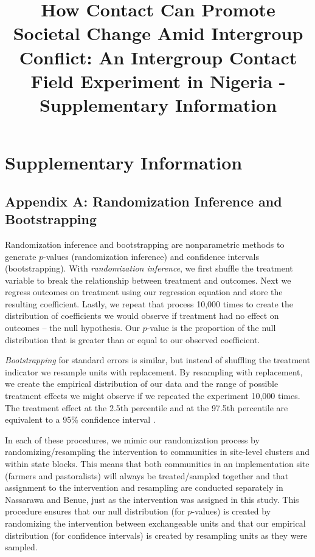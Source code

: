 \documentclass[
]{article}
\title{How Contact Can Promote Societal Change Amid Intergroup Conflict:
An Intergroup Contact Field Experiment in Nigeria - Supplementary
Information}
\author{}
\date{\vspace{-2.5em}}
\begin{document}
\maketitle

{
\setcounter{tocdepth}{2}
\tableofcontents
}
\hypertarget{supplementary-information}{%
\section{Supplementary Information}\label{supplementary-information}}

\hypertarget{appendix-a-randomization-inference-and-bootstrapping}{%
\subsection{Appendix A: Randomization Inference and
Bootstrapping}\label{appendix-a-randomization-inference-and-bootstrapping}}

Randomization inference and bootstrapping are nonparametric methods to
generate \(p\)-values (randomization inference) and confidence intervals
(bootstrapping). With \emph{randomization inference}, we first shuffle
the treatment variable to break the relationship between treatment and
outcomes. Next we regress outcomes on treatment using our regression
equation and store the resulting coefficient. Lastly, we repeat that
process 10,000 times to create the distribution of coefficients we would
observe if treatment had no effect on outcomes -- the null hypothesis.
Our \(p\)-value is the proportion of the null distribution that is
greater than or equal to our observed coefficient.

\emph{Bootstrapping} for standard errors is similar, but instead of
shuffling the treatment indicator we resample units with replacement. By
resampling with replacement, we create the empirical distribution of our
data and the range of possible treatment effects we might observe if we
repeated the experiment 10,000 times. The treatment effect at the 2.5th
percentile and at the 97.5th percentile are equivalent to a 95\%
confidence interval .

In each of these procedures, we mimic our randomization process by
randomizing/resampling the intervention to communities in site-level
clusters and within state blocks. This means that both communities in an
implementation site (farmers and pastoralists) will always be
treated/sampled together and that assignment to the intervention and
resampling are conducted separately in Nassarawa and Benue, just as the
intervention was assigned in this study. This procedure ensures that our
null distribution (for \(p\)-values) is created by randomizing the
intervention between exchangeable units and that our empirical
distribution (for confidence intervals) is created by resampling units
as they were sampled.
\end{document}
